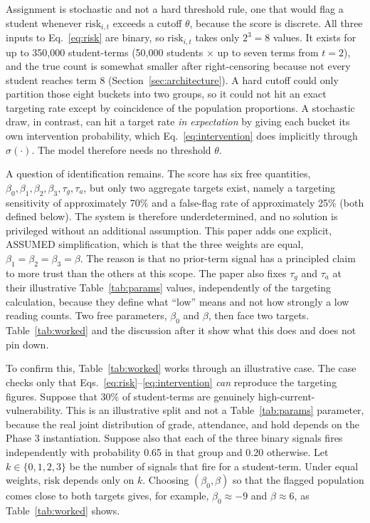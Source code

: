 \documentclass[11pt]{article}
\begin{document}
Assignment is stochastic and not a hard threshold rule, one that would flag a student whenever $\text{risk}_{i,t}$ exceeds a cutoff $\theta$, because the score is discrete. All three inputs to Eq.~\ref{eq:risk} are binary, so $\text{risk}_{i,t}$ takes only $2^3=8$ values. It exists for up to 350,000 student-terms (50,000 students $\times$ up to seven terms from $t=2$), and the true count is somewhat smaller after right-censoring because not every student reaches term 8 (Section~\ref{sec:architecture}). A hard cutoff could only partition those eight buckets into two groups, so it could not hit an exact targeting rate except by coincidence of the population proportions. A stochastic draw, in contrast, can hit a target rate \emph{in expectation} by giving each bucket its own intervention probability, which Eq.~\ref{eq:intervention} does implicitly through $\sigma(\cdot)$. The model therefore needs no threshold $\theta$.

A question of identification remains. The score has six free quantities, $\beta_0,\beta_1,\beta_2,\beta_3,\tau_g,\tau_a$, but only two aggregate targets exist, namely a targeting sensitivity of approximately 70\% and a false-flag rate of approximately 25\% (both defined below). The system is therefore underdetermined, and no solution is privileged without an additional assumption. This paper adds one explicit, ASSUMED simplification, which is that the three weights are equal, $\beta_1=\beta_2=\beta_3=\beta$. The reason is that no prior-term signal has a principled claim to more trust than the others at this scope. The paper also fixes $\tau_g$ and $\tau_a$ at their illustrative Table~\ref{tab:params} values, independently of the targeting calculation, because they define what ``low'' means and not how strongly a low reading counts. Two free parameters, $\beta_0$ and $\beta$, then face two targets. Table~\ref{tab:worked} and the discussion after it show what this does and does not pin down.

To confirm this, Table~\ref{tab:worked} works through an illustrative case. The case checks only that Eqs.~\ref{eq:risk}--\ref{eq:intervention} \emph{can} reproduce the targeting figures. Suppose that 30\% of student-terms are genuinely high-current-vulnerability. This is an illustrative split and not a Table~\ref{tab:params} parameter, because the real joint distribution of grade, attendance, and hold depends on the Phase 3 instantiation. Suppose also that each of the three binary signals fires independently with probability 0.65 in that group and 0.20 otherwise. Let $k \in \{0,1,2,3\}$ be the number of signals that fire for a student-term. Under equal weights, $\text{risk}$ depends only on $k$. Choosing $(\beta_0,\beta)$ so that the flagged population comes close to both targets gives, for example, $\beta_0 \approx -9$ and $\beta \approx 6$, as Table~\ref{tab:worked} shows.
\end{document}
